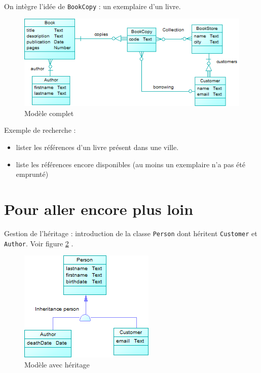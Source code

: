 \documentclass[small,algo]{dushClass} %
\begin{document}
On intègre l'idée de \texttt{BookCopy} : un exemplaire d'un livre.\\

\begin{figure}[ht]
	\center
	\includegraphics{images/model_real.png}
	\caption{Modèle complet}\label{model-real}
\end{figure}

Exemple de recherche : 
\begin{itemize}
\item lister les références d'un livre présent dans une ville.
\item liste les références encore disponibles (au moins un exemplaire n'a pas été emprunté)
\end{itemize}

\section{Pour aller encore plus loin}

Gestion de l'héritage : introduction de la classe \texttt{Person} dont héritent \texttt{Customer} et \texttt{Author}. Voir figure \ref{model-inheritance} .\\


\begin{figure}[ht]
	\center
	\includegraphics{images/model_inheritance.png}
	\caption{Modèle avec héritage}\label{model-inheritance}
\end{figure}
\end{document}
